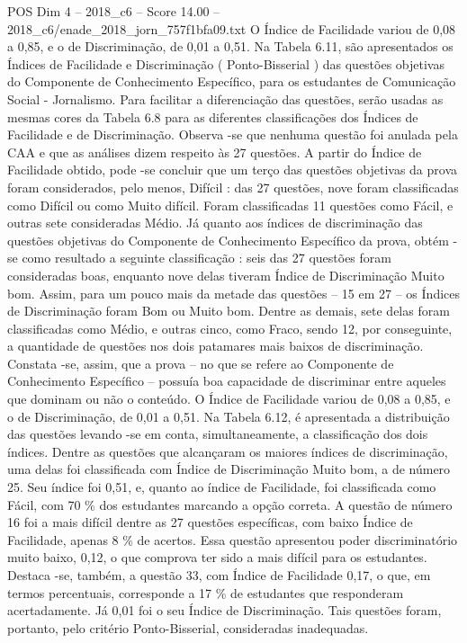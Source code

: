 \begin{textsample}{POS Dim 4 – 2018\_c6 – Score 14.00 – 2018\_c6/enade\_2018\_jorn\_757f1bfa09.txt}
O Índice de Facilidade variou de 0,08 a 0,85, e o de Discriminação, de 0,01 a 0,51.
Na Tabela 6.11, são apresentados os Índices de Facilidade e Discriminação ( Ponto-Bisserial ) das questões objetivas do Componente de Conhecimento Específico, para os estudantes de Comunicação Social - Jornalismo.
Para facilitar a diferenciação das questões, serão usadas as mesmas cores da Tabela 6.8 para as diferentes classificações dos Índices de Facilidade e de Discriminação.
Observa -se que nenhuma questão foi anulada pela CAA e que as análises dizem respeito às 27 questões.
A partir do Índice de Facilidade obtido, pode -se concluir que um terço das questões objetivas da prova foram considerados, pelo menos, Difícil : das 27 questões, nove foram classificadas como Difícil ou como Muito difícil.
Foram classificadas 11 questões como Fácil, e outras sete consideradas Médio.
Já quanto aos índices de discriminação das questões objetivas do Componente de Conhecimento Específico da prova, obtém -se como resultado a seguinte classificação : seis das 27 questões foram consideradas boas, enquanto nove delas tiveram Índice de Discriminação Muito bom.
Assim, para um pouco mais da metade das questões – 15 em 27 – os Índices de Discriminação foram Bom ou Muito bom.
Dentre as demais, sete delas foram classificadas como Médio, e outras cinco, como Fraco, sendo 12, por conseguinte, a quantidade de questões nos dois patamares mais baixos de discriminação.
Constata -se, assim, que a prova – no que se refere ao Componente de Conhecimento Específico – possuía boa capacidade de discriminar entre aqueles que dominam ou não o conteúdo.
O Índice de Facilidade variou de 0,08 a 0,85, e o de Discriminação, de 0,01 a 0,51.
Na Tabela 6.12, é apresentada a distribuição das questões levando -se em conta, simultaneamente, a classificação dos dois índices.
Dentre as questões que alcançaram os maiores índices de discriminação, uma delas foi classificada com Índice de Discriminação Muito bom, a de número 25.
Seu índice foi 0,51, e, quanto ao índice de Facilidade, foi classificada como Fácil, com 70 \% dos estudantes marcando a opção correta.
A questão de número 16 foi a mais difícil dentre as 27 questões específicas, com baixo Índice de Facilidade, apenas 8 \% de acertos.
Essa questão apresentou poder discriminatório muito baixo, 0,12, o que comprova ter sido a mais difícil para os estudantes.
Destaca -se, também, a questão 33, com Índice de Facilidade 0,17, o que, em termos percentuais, corresponde a 17 \% de estudantes que responderam acertadamente.
Já 0,01 foi o seu Índice de Discriminação.
Tais questões foram, portanto, pelo critério Ponto-Bisserial, consideradas inadequadas.

\end{textsample}
